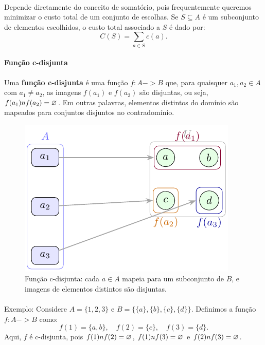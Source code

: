 \documentclass[12pt,a4paper]{article}
\def\emph#1{#1}%
\def\cap{\string n}%
\def\to{->}%
\begin{document}
\paragraph{}
Depende diretamente do conceito de somatório, pois frequentemente queremos minimizar o custo total de um conjunto de escolhas. Se \(S \subseteq A\) é um subconjunto de elementos escolhidos, o custo total associado a \(S\) é dado por:
\[C(S) = \sum_{a \in S} c(a).\]

\paragraph{Função c-disjunta}
Uma \textbf{função c-disjunta} é uma função \(f: A \to B\) que, para quaisquer \(a_1, a_2 \in A\) com \(a_1 \neq a_2\), as imagens \(f(a_1)\) e \(f(a_2)\) são disjuntas, ou seja, \(f(a_1) \cap f(a_2) = \varnothing\). Em outras palavras, elementos distintos do domínio são mapeados para conjuntos disjuntos no contradomínio.


\begin{figure}[H]
    \centering
    \includegraphics[width=0.9\linewidth]{figures/fig_c_disjunta.pdf}

    \caption{Função c-disjunta: cada \(a\in A\) mapeia para um \emph{subconjunto} de $B$, e imagens de elementos distintos são disjuntas.}
    \label{fig:c-disjunta}
\end{figure}


\paragraph{}
Exemplo: Considere \(A = \{1, 2, 3\}\) e \(B = \{\{a\}, \{b\}, \{c\}, \{d\}\}\). Definimos a função \(f: A \to B\) como:
\[f(1) = \{a, b\}, \quad f(2) = \{c\}, \quad f(3) = \{d\}.\]
Aqui, \(f\) é c-disjunta, pois \(f(1) \cap f(2) = \varnothing\), \(f(1) \cap f(3) = \varnothing\) e \(f(2) \cap f(3) = \varnothing\).
\end{document}
